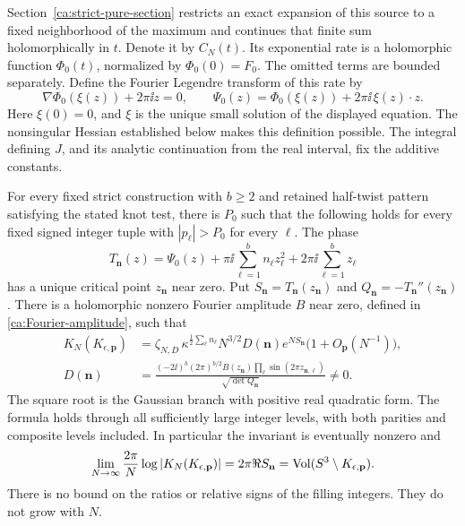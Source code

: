 Section~\ref{ca:strict-pure-section} restricts an exact expansion of
this source to a fixed neighborhood of the maximum and continues
that finite sum holomorphically in $t$. Denote it by $C_N(t)$.
Its exponential rate is a holomorphic function $\Phi_0(t)$,
normalized by $\Phi_0(0)=F_0$. The omitted terms are bounded
separately. Define the Fourier Legendre transform of this rate by
\begin{equation}\label{ca:Psi}
 \nabla\Phi_0(\xi(z))+2\pi\ii z=0,\qquad
 \Psi_0(z)=\Phi_0(\xi(z))+2\pi\ii\,\xi(z)\cdot z.
\end{equation}
Here $\xi(0)=0$, and $\xi$ is the unique small solution of the
displayed equation. The nonsingular Hessian established below makes
this definition possible. The integral defining $J$, and its analytic
continuation from the real interval, fix the additive constants.

\begin{theorem}\label{ca:main}
For every fixed strict construction with $b\ge2$ and retained half-twist pattern satisfying the stated knot test, there is $P_0$ such that the following holds for every fixed signed integer tuple with $|p_\ell|>P_0$ for every $\ell$. The phase
\[
 T_{\mathbf n}(z)=\Psi_0(z)+\pi\ii\sum_{\ell=1}^b n_\ell z_\ell^2
                           +2\pi\ii\sum_{\ell=1}^b z_\ell
\]
has a unique critical point $z_{\mathbf n}$ near zero. Put
$S_{\mathbf n}=T_{\mathbf n}(z_{\mathbf n})$ and
$Q_{\mathbf n}=-T_{\mathbf n}''(z_{\mathbf n})$. There is a holomorphic nonzero Fourier amplitude $B$ near zero, defined in \eqref{ca:Fourier-amplitude}, such that
\begin{align}
 K_N(K_{\epsilon,\mathbf p})
 &=\zeta_{N,D}\,\kappa^{\frac12\sum_\ell n_\ell}
 N^{3/2}D(\mathbf n)e^{NS_{\mathbf n}}
 \bigl(1+O_{\mathbf p}(N^{-1})\bigr),\label{ca:asymptotic}\\
 D(\mathbf n)&=
 \frac{(-2\ii)^b(2\pi)^{b/2}B(z_{\mathbf n})
       \prod_\ell\sin(2\pi z_{\mathbf n,\ell})}
      {\sqrt{\det Q_{\mathbf n}}}\ne0.\label{ca:D}
\end{align}
The square root is the Gaussian branch with positive real quadratic form. The formula holds through all sufficiently large integer levels, with both parities and composite levels included. In particular the invariant is eventually nonzero and
\begin{equation}\label{ca:volume}
 \lim_{N\to\infty}\frac{2\pi}{N}\log|K_N(K_{\epsilon,\mathbf p})|
 =2\pi\Re S_{\mathbf n}
 =\operatorname{Vol}(S^3\setminus K_{\epsilon,\mathbf p}).
\end{equation}
There is no bound on the ratios or relative signs of the filling integers. They do not grow with $N$.
\end{theorem}

